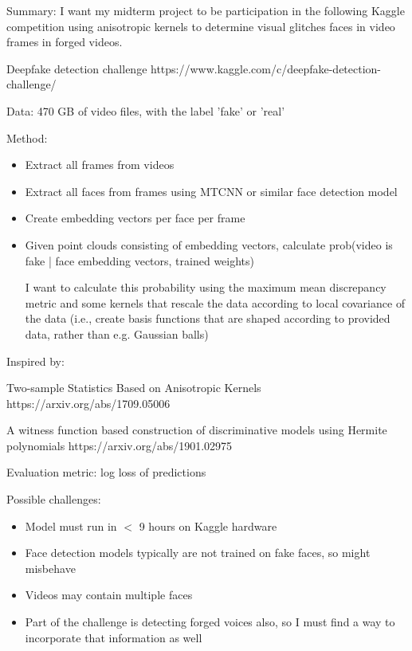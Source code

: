 \documentclass[12pt,letterpaper]{hmcpset}
\begin{document}
\problemlist{}



\begin{solution}
    Summary: 
    I want my midterm project to be participation in the following Kaggle competition using anisotropic kernels to determine visual glitches faces in video frames in forged videos.

    Deepfake detection challenge https://www.kaggle.com/c/deepfake-detection-challenge/

    Data: 470 GB of video files, with the label 'fake' or 'real'

    Method:
\begin{itemize}
    \item Extract all frames from videos

    \item Extract all faces from frames using MTCNN or similar face detection model
    \item Create embedding vectors per face per frame
    \item Given point clouds consisting of embedding vectors, calculate prob(video is fake | face embedding vectors, trained weights)

        I want to calculate this probability using the maximum mean discrepancy metric and some kernels that rescale the data according to local covariance of the data (i.e., create basis functions that are shaped according to provided data, rather than e.g. Gaussian balls)


    \end{itemize}

Inspired by:

Two-sample Statistics Based on Anisotropic Kernels
https://arxiv.org/abs/1709.05006

A witness function based construction of discriminative models using Hermite polynomials 
https://arxiv.org/abs/1901.02975

Evaluation metric: log loss of predictions

Possible challenges:
\begin{itemize}
    \item Model must run in $<$ 9 hours on Kaggle hardware
    \item Face detection models typically are not trained on fake faces, so might misbehave
    \item Videos may contain multiple faces
    \item Part of the challenge is detecting forged voices also, so I must find a way to incorporate that information as well
\end{itemize}
\end{solution}

\end{document}
